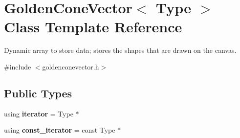 \hypertarget{class_golden_cone_vector}{}\section{Golden\+Cone\+Vector$<$ Type $>$ Class Template Reference}
\label{class_golden_cone_vector}


Dynamic array to store data; stores the shapes that are drawn on the canvas.  




{\ttfamily \#include $<$goldenconevector.\+h$>$}

\subsection*{Public Types}
\begin{DoxyCompactItemize}
\item 
\mbox{\label{class_golden_cone_vector_a12d32794f339d73ceabc4081d2eb1b05}} 
using {\bfseries iterator} = Type $\ast$
\item 
\mbox{\label{class_golden_cone_vector_a4c8b76545a9abcb250d930e7f8f573d9}} 
using {\bfseries const\+\_\+iterator} = const Type $\ast$
\end{DoxyCompactItemize}
